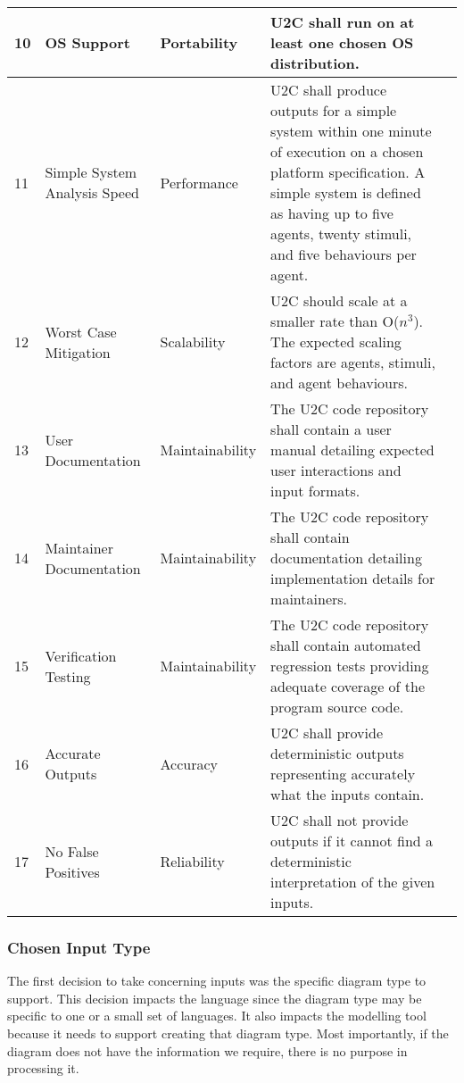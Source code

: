 \begin{longtable}{|l|p{2.6cm}|l|p{4.5cm}|c|}
    \hline
    10 & OS Support & Portability & U2C shall run on at least one chosen OS distribution. & \cellcolor{green!30}  \\
    \hline
    11 & Simple System Analysis Speed & Performance & U2C shall produce outputs for a simple system within one minute of execution on a chosen platform specification.
    A simple system is defined as having up to five agents, twenty stimuli, and five behaviours per agent. & \cellcolor{gray!30}  \\
    \hline
    12 & Worst Case Mitigation & Scalability & U2C should scale at a smaller rate than O($n^3$). The expected scaling factors are agents, stimuli, and agent behaviours. & \cellcolor{gray!30}  \\
    \hline
    13 & User Documentation & Maintainability & The U2C code repository shall contain a user manual detailing expected user interactions and input formats. & \cellcolor{gray!30}  \\
    \hline
    14 & Maintainer Documentation & Maintainability & The U2C code repository shall contain documentation detailing implementation details for maintainers. & \cellcolor{green!30}  \\
    \hline
    15 & Verification Testing & Maintainability & The U2C code repository shall contain automated regression tests providing adequate coverage of the program source code. & \cellcolor{green!30}  \\
    \hline
    16 & Accurate Outputs & Accuracy & U2C shall provide deterministic outputs representing accurately what the inputs contain. & \cellcolor{green!30}  \\
    \hline
    17 & No False Positives & Reliability & U2C shall not provide outputs if it cannot find a deterministic interpretation of the given inputs. & \cellcolor{gray!30}  \\
    \hline
\end{longtable}

\subsubsection{Chosen Input Type}
The first decision to take concerning inputs was the specific diagram type to support.
This decision impacts the language since the diagram type may be specific to one or a small set of languages.
It also impacts the modelling tool because it needs to support creating that diagram type.
Most importantly, if the diagram does not have the information we require, there is no purpose in processing it.

